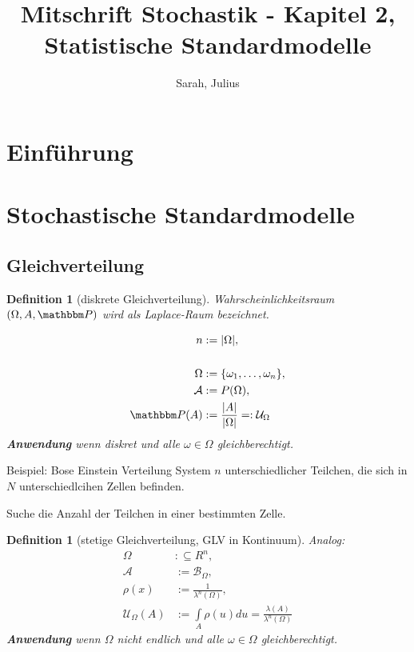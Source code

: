 \documentclass[a4paper,12pt]{article}%
\title{Mitschrift Stochastik - Kapitel 2, Statistische Standardmodelle}
\author{Sarah, Julius}
\newtheorem{myDef}[thm]{Definition}
\newcommand{\A}{\mathcal{A}}
\newcommand{\B}{\mathcal{B}}
\newcommand{\U}{\mathcal{U}}
\newcommand{\PP}{\mathbbm P}
\newcommand{\invisible}[1]{#1}
\begin{document}
	\maketitle
	\tableofcontents
	\section{Einführung}
	\newpage
	\section{Stochastische Standardmodelle}
	\subsection{Gleichverteilung }
	
	\begin{myDef}[diskrete Gleichverteilung]
		
		Wahrscheinlichkeitsraum $(\Omega, A, \PP)$ wird als Laplace-Raum bezeichnet.
		
		\begin{align*}
		n &:= | \Omega |, \\
		\\
		\Omega &:= \{\omega_1, \dots, \omega_n\}, \\
		\A &:= P(\Omega),\\
		\PP(A) &:= \frac{|A|}{|\Omega|} =: \U_\Omega
		\end{align*}
		{\bf Anwendung} wenn diskret und alle $\omega \in \Omega$ gleichberechtigt.
		
	\end{myDef}
	
	\invisible{
		
		Beispiel: Bose Einstein Verteilung
		System $n$ unterschiedlicher Teilchen, die sich in $N$ unterschiedlcihen Zellen befinden. 
		
		Suche die Anzahl der Teilchen in einer bestimmten Zelle.
		}
	
	
	
	
	
	
	
	\begin{myDef}[stetige Gleichverteilung, GLV in Kontinuum]
		Analog:
		\begin{align*}
			\Omega &:\subseteq R^n,\\
			\A &:= \B_{\Omega},\\
			\rho(x) &:= \frac{1}{\lambda^n(\Omega)},\\ 
			\U_\Omega(A) &:= \int \limits_{A} \rho (u) d u = \frac{\lambda(A)}{\lambda^n(\Omega)}
		\end{align*}
		{\bf Anwendung} wenn $\Omega$ nicht endlich und alle $\omega \in \Omega$ gleichberechtigt.
	\end{myDef}
	
\end{document}
